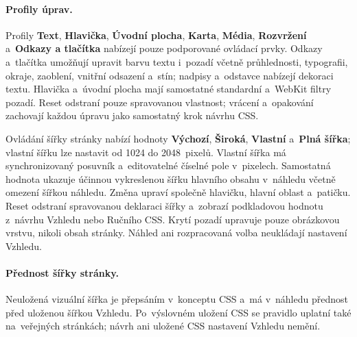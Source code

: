 \documentclass[11pt,a4paper]{article}
\newcommand{\ui}[1]{\textbf{#1}}
\begin{document}
\paragraph{Profily úprav.} Profily \ui{Text}, \ui{Hlavička}, \ui{Úvodní plocha},
\ui{Karta}, \ui{Média}, \ui{Rozvržení} a~\ui{Odkazy a tlačítka} nabízejí pouze
podporované ovládací prvky. Odkazy a~tlačítka umožňují upravit barvu textu
i~pozadí včetně průhlednosti, typografii, okraje, zaoblení, vnitřní odsazení
a~stín; nadpisy a~odstavce nabízejí dekoraci textu. Hlavička a~úvodní plocha
mají samostatné standardní a~WebKit filtry pozadí. Reset odstraní pouze
spravovanou vlastnost; vrácení a~opakování zachovají každou úpravu jako
samostatný krok návrhu CSS.

Ovládání šířky stránky nabízí hodnoty \ui{Výchozí}, \ui{Široká}, \ui{Vlastní}
a~\ui{Plná šířka}; vlastní šířku lze nastavit od 1024 do 2048~pixelů. Vlastní
šířka má synchronizovaný posuvník a~editovatelné číselné pole v~pixelech.
Samostatná hodnota ukazuje účinnou vykreslenou šířku hlavního obsahu v~náhledu
včetně omezení šířkou náhledu. Změna upraví společně hlavičku, hlavní oblast
a~patičku. Reset odstraní spravovanou deklaraci šířky a~zobrazí podkladovou
hodnotu z~návrhu Vzhledu nebo Ručního CSS. Krytí pozadí upravuje pouze
obrázkovou vrstvu, nikoli obsah stránky. Náhled ani rozpracovaná volba
neukládají nastavení Vzhledu.
\paragraph{Přednost šířky stránky.} Neuložená vizuální šířka je přepsáním
v~konceptu CSS a~má v~náhledu přednost před uloženou šířkou Vzhledu.
Po~výslovném uložení CSS se pravidlo uplatní také na~veřejných stránkách; návrh
ani uložené CSS nastavení Vzhledu nemění.
\end{document}
